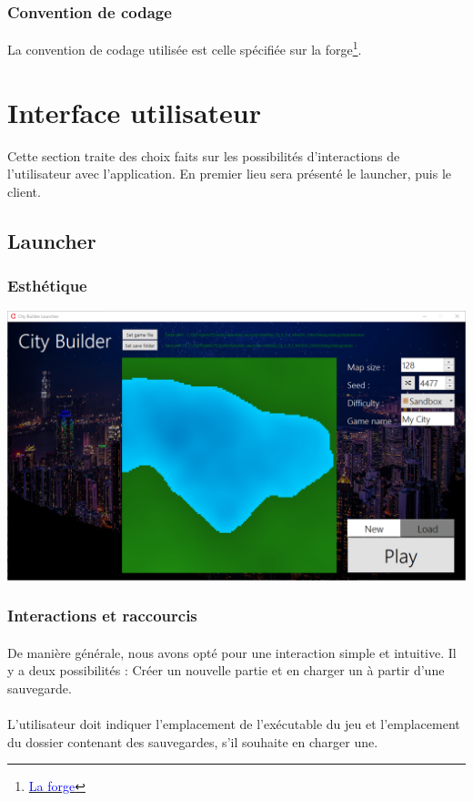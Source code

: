\documentclass[a4paper,10pt,openany,oneside]{report}
\begin{document}
\subsubsection{Convention de codage}
La convention de codage utilisée est celle spécifiée sur la forge\footnote{\href{https://forge.ing.he-arc.ch/gitlab/dgr/Ressources/wikis/convention}{\textcolor{blue}{La forge}}}.
\section{Interface utilisateur}
Cette section traite des choix faits sur les possibilités d'interactions de l'utilisateur avec l'application. En premier lieu sera présenté le launcher, puis le client. 
\subsection{Launcher}
\subsubsection{Esthétique}
\includegraphics[width=\textwidth]{img/ui_launcher.png}
\subsubsection{Interactions et raccourcis}
\paragraph{}
De manière générale, nous avons opté pour une interaction simple et intuitive. Il y a deux possibilités : Créer un nouvelle partie et en charger un à partir d'une sauvegarde.
\paragraph{}
L'utilisateur doit indiquer l'emplacement de l'exécutable du jeu et l'emplacement du dossier contenant des sauvegardes, s'il souhaite en charger une.
\end{document}
